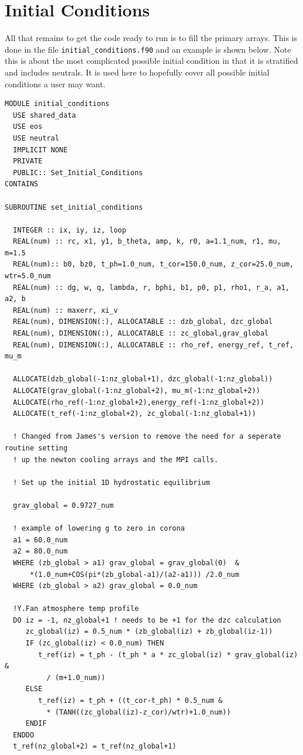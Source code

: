 \documentclass[11pt]{article}
\begin{document}
\section{Initial Conditions}
All that remains to get the code ready to run is to fill the primary arrays. This is done in the file \texttt{initial\_conditions.f90} and an example is shown below. Note this is about the most complicated possible initial condition in that it is stratified and includes neutrals. It is used here to hopefully cover all possible initial conditions a user may want.  
\begin{verbatim}
MODULE initial_conditions
  USE shared_data
  USE eos
  USE neutral
  IMPLICIT NONE
  PRIVATE
  PUBLIC:: Set_Initial_Conditions
CONTAINS

SUBROUTINE set_initial_conditions

  INTEGER :: ix, iy, iz, loop
  REAL(num) :: rc, x1, y1, b_theta, amp, k, r0, a=1.1_num, r1, mu, m=1.5
  REAL(num):: b0, bz0, t_ph=1.0_num, t_cor=150.0_num, z_cor=25.0_num, wtr=5.0_num
  REAL(num) :: dg, w, q, lambda, r, bphi, b1, p0, p1, rho1, r_a, a1, a2, b 
  REAL(num) :: maxerr, xi_v
  REAL(num), DIMENSION(:), ALLOCATABLE :: dzb_global, dzc_global
  REAL(num), DIMENSION(:), ALLOCATABLE :: zc_global,grav_global   
  REAL(num), DIMENSION(:), ALLOCATABLE :: rho_ref, energy_ref, t_ref, mu_m
  
  ALLOCATE(dzb_global(-1:nz_global+1), dzc_global(-1:nz_global))
  ALLOCATE(grav_global(-1:nz_global+2), mu_m(-1:nz_global+2))
  ALLOCATE(rho_ref(-1:nz_global+2),energy_ref(-1:nz_global+2))
  ALLOCATE(t_ref(-1:nz_global+2), zc_global(-1:nz_global+1))
  
  ! Changed from James's version to remove the need for a seperate routine setting
  ! up the newton cooling arrays and the MPI calls.
  
  ! Set up the initial 1D hydrostatic equilibrium
  
  grav_global = 0.9727_num
  
  ! example of lowering g to zero in corona
  a1 = 60.0_num
  a2 = 80.0_num
  WHERE (zb_global > a1) grav_global = grav_global(0)  &
      *(1.0_num+COS(pi*(zb_global-a1)/(a2-a1))) /2.0_num
  WHERE (zb_global > a2) grav_global = 0.0_num
  
  !Y.Fan atmosphere temp profile
  DO iz = -1, nz_global+1 ! needs to be +1 for the dzc calculation
     zc_global(iz) = 0.5_num * (zb_global(iz) + zb_global(iz-1))
     IF (zc_global(iz) < 0.0_num) THEN
        t_ref(iz) = t_ph - (t_ph * a * zc_global(iz) * grav_global(iz) &
          / (m+1.0_num))
     ELSE
        t_ref(iz) = t_ph + ((t_cor-t_ph) * 0.5_num &
          * (TANH((zc_global(iz)-z_cor)/wtr)+1.0_num))
     ENDIF
  ENDDO
  t_ref(nz_global+2) = t_ref(nz_global+1)


\end{verbatim}
\end{document}
